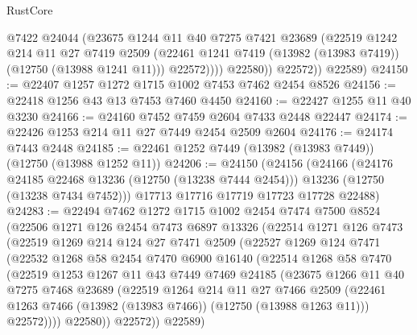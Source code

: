 \begin{lexlean}{RustCore}
\begin{coremodule}
                  @7422
                  @24044
                  (@23675
                    @1244
                    @11
                    @40
                    @7275
                    @7421
                    @23689
                    (@22519
                      @1242
                      @214
                      @11
                      @27
                      @7419
                      @2509
                      (@22461 @1241 @7419 (@13982 (@13983 @7419)) (@12750 (@13988 @1241 @11)))
                      @22572))))
              @22580))
          @22572))
      @22589)
@24150 := @22407 @1257 @1272 @1715 @1002 @7453 @7462 @2454 @8526
@24156 := @22418 @1256 @43 @13 @7453 @7460 @4450
@24160 := @22427 @1255 @11 @40 @3230
@24166 := @24160 @7452 @7459 @2604 @7433 @2448 @22447
@24174 := @22426 @1253 @214 @11 @27 @7449 @2454 @2509 @2604
@24176 := @24174 @7443 @2448
@24185 := @22461 @1252 @7449 (@13982 (@13983 @7449)) (@12750 (@13988 @1252 @11))
@24206 := @24150
    (@24156
      (@24166
        (@24176 @24185 @22468 @13236 (@12750 (@13238 @7444 @2454)))
        @13236
        (@12750 (@13238 @7434 @7452)))
      @17713
      @17716
      @17719
      @17723
      @17728
      @22488)
@24283 := @22494
    @7462
    @1272
    @1715
    @1002
    @2454
    @7474
    @7500
    @8524
    (@22506
      @1271
      @126
      @2454
      @7473
      @6897
      @13326
      (@22514
        @1271
        @126
        @7473
        (@22519
          @1269
          @214
          @124
          @27
          @7471
          @2509
          (@22527
            @1269
            @124
            @7471
            (@22532
              @1268
              @58
              @2454
              @7470
              @6900
              @16140
              (@22514
                @1268
                @58
                @7470
                (@22519
                  @1253
                  @1267
                  @11
                  @43
                  @7449
                  @7469
                  @24185
                  (@23675
                    @1266
                    @11
                    @40
                    @7275
                    @7468
                    @23689
                    (@22519
                      @1264
                      @214
                      @11
                      @27
                      @7466
                      @2509
                      (@22461 @1263 @7466 (@13982 (@13983 @7466)) (@12750 (@13988 @1263 @11)))
                      @22572))))
              @22580))
          @22572))
      @22589)

\end{coremodule}
\end{lexlean}
